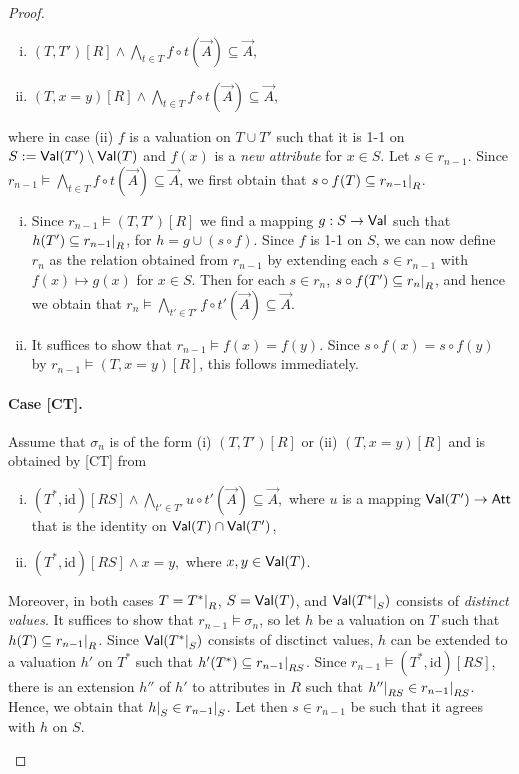 \documentclass[envcountset]{llncs}
\newcommand{\problemFont}[1]{\protect\ensuremath{\mathsf{#1}}}
\newcommand{\si}{\sigma}
\newcommand{\sub}{\subseteq}
\newcommand{\tuple}[1]{\vec{#1}}
\newcommand{\ja}{\wedge}
\newcommand{\at}{\problemFont{Att}}
\newcommand\re[2]{{\left.\kern-\nulldelimiterspace #1 \vphantom{|} \right|_{#2} }}
\newcommand{\Val}{\problemFont{Val}}
\newcommand{\id}{\mathrm{id}}
\begin{document}
\begin{proof}
\begin{enumerate}[(i)]
\item $( T, T')[R] \ja \bigwedge_{t\in T}f\circ  t(\tuple A) \sub \tuple  A, $
\item $(T,x=y)[R] \ja \bigwedge_{t\in T} f\circ  t(\tuple A) \sub \tuple A, $
\end{enumerate}
where in case (ii) $f$ is a valuation on $T\cup T'$ such that it is 1-1 on  $S:=\Val(T')\setminus\Val(T)$ and $f(x)$ is a \emph{new attribute} for $x\in S$.  Let $s\in r_{n-1}$. Since $r_{n-1}\models \bigwedge_{t\in T}f\circ  t(\tuple A) \sub \tuple  A $,   we first obtain that $s\circ f (T)\sub \re{r_{n-1}}{R}$. \begin{enumerate}[(i)]
\item  Since $r_{n-1} \models ( T, T')[R]$ we find a mapping $g:S\to \Val$  such that $h(T')\sub \re{r_{n-1}}{R}$, for $h= g\cup (s\circ f)$. Since $f$ is 1-1 on $S$, we  can now define $r_n$ as the relation obtained from $r_{n-1}$ by extending each $s\in r_{n-1}$ with $f(x) \mapsto g(x)$ for $x \in S$. Then for each $s\in r_n$,  $s\circ f(T')\sub \re{r_n}{R}$, and hence  we obtain that $r_n \models \bigwedge_{t'\in T'} f\circ t'(\tuple A) \sub \tuple A.$
\item  It suffices to show that $r_{n-1}\models f(x)=f(y)$. Since $s\circ f (x)=s\circ f(y)$ by $r_{n-1} \models (T,x=y)[R]$, this follows immediately.
\end{enumerate}

\paragraph{\textbf{Case [CT].}} Assume that $\si_n$ is of the form (i) $(T ,T')[ R]$ or (ii) $(T ,x=y)[ R]$ and  is obtained by [CT] from 
\begin{enumerate}[(i)]
\item $(T^*,\id)[R S]\ja\bigwedge_{t'\in T'} u\circ t'(\tuple A)\sub \tuple A,$ where  $u$ is a mapping  $\Val(T')\to \at$ that is the identity on $\Val(T)\cap\Val(T')$,
\item $(T^*,\id)[ R  S]\ja x=y,$ where $x,y\in \Val(T)$.
\end{enumerate}
Moreover, in both cases $T=\re{T^*}{R}$, $S= \Val(T)$,  and $\Val(\re{T^*}{S})$ consists of \emph{distinct values}. It suffices to show that $r_{n-1}\models \si_n$, so let $h$ be a valuation on $T$ such that $h(T)\sub \re{r_{n-1}}{R}$. Since $\Val(\re{T^*}{S})$ consists of disctinct values, $h$ can be extended to a valuation $h'$ on $T^*$ such that $h'(T^*)\sub \re{r_{n-1}}{RS}$. Since $r_{n-1}\models (T^*,\id)[R S]$, there is an extension $h''$ of $h'$ to attributes in $R$ such that $\re{h''}{RS} \in \re{r_{n-1}}{RS}$. Hence, we obtain that $\re{h}{S} \in \re{r_{n-1}}{S}$. Let then $s\in r_{n-1}$ be such that it agrees with $h$ on $S$.
\begin{enumerate}[(i)]


\end{enumerate}
\end{proof}
\end{document}
